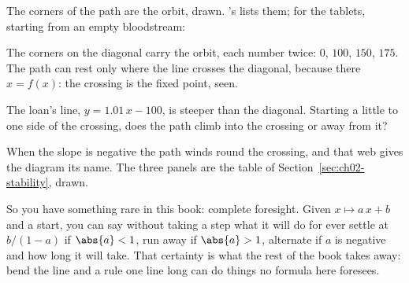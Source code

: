 \noindent
The corners of the path are the orbit, drawn. 's
 lists them; for the tablets, starting from an empty
bloodstream:



\noindent
The corners on the diagonal carry the orbit, each number twice: $0$,
$100$, $150$, $175$. The path can rest only where the line crosses the
diagonal, because there $x = f(x)$: the crossing is the fixed point, seen.

\begin{think}
The loan's line, $y = \num{1.01}\,x - 100$, is steeper than the diagonal.
Starting a little to one side of the crossing, does the path climb into the
crossing or away from it?
\end{think}


\noindent
When the slope is negative the path winds round the crossing, and that web
gives the diagram its name. The three panels are the table of
Section~\ref{sec:ch02-stability}, drawn.

So you have something rare in this book: complete foresight. Given
$x \mapsto a\,x + b$ and a start, you can say without taking a step what it
will do for ever \dash{} settle at $b/(1 - a)$ if $\abs{a} < 1$, run away if
$\abs{a} > 1$, alternate if $a$ is negative \dash{} and how long it will
take. That certainty is what the rest of the book takes away: bend the line
and a rule one line long can do things no formula here foresees.


